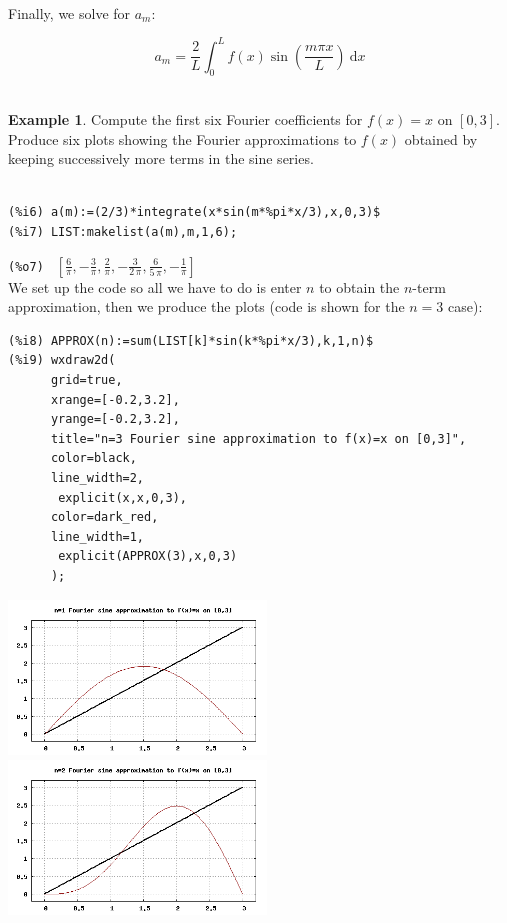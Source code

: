 \documentclass[10.5pt,twoside]{report}
\theoremstyle{definition}
\newtheorem{exmp}{Example}[section]
\begin{document}
${}$\\

Finally, we solve for $a_m$:

\[a_m=\frac{2}{L}\int_{0}^{L} f(x) \sin{\left( \frac{m\pi x}{L}\right) }\ \mathrm{d}x\]
${}$\\

\begin{exmp} Compute the first six Fourier coefficients for $f(x)=x$ on $[0,3]$.  Produce six plots showing the Fourier approximations to $f(x)$ obtained by keeping successively more terms in the sine series.\\

${}$\\

\begin{verbatim}
(%i6) a(m):=(2/3)*integrate(x*sin(m*%pi*x/3),x,0,3)$
(%i7) LIST:makelist(a(m),m,1,6);
\end{verbatim}
\verb|(%o7) | $[\frac{6}{\pi },-\frac{3}{\pi },\frac{2}{\pi },-\frac{3}{2\,\pi },\frac{6}{5\,\pi },-\frac{1}{\pi }]$
${}$\\

We set up the code so all we have to do is enter $n$ to obtain the $n$-term approximation, then we produce the plots (code is shown for the $n=3$ case):

\begin{verbatim}
(%i8) APPROX(n):=sum(LIST[k]*sin(k*%pi*x/3),k,1,n)$
(%i9) wxdraw2d(
      grid=true,
      xrange=[-0.2,3.2],
      yrange=[-0.2,3.2],
      title="n=3 Fourier sine approximation to f(x)=x on [0,3]",
      color=black,
      line_width=2,
       explicit(x,x,0,3),
      color=dark_red,
      line_width=1,
       explicit(APPROX(3),x,0,3)
      );
\end{verbatim}


\includegraphics[width=2.7in]{example_6_5_2_1}
\includegraphics[width=2.7in]{example_6_5_2_2}


\end{exmp}
\end{document}

